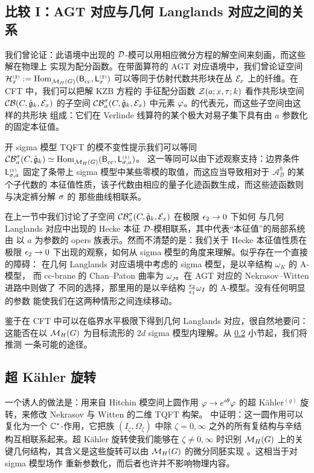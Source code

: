 \subsection{比较 I：AGT 对应与几何 Langlands 对应之间的关系}\label{comp-I}

我们曾论证：此语境中出现的 $\mathcal{D}$-模可以用相应微分方程的解空间来刻画，而这些解在物理上
实现为配分函数。在带面算符的 AGT 对应语境中，我们曾论证空间
$\mathcal{H}_{x}^{\scriptscriptstyle(2)}:=
{\rm Hom}_{\mathcal{M}_H(G)}^{}(\mathsf{B}_{\rm cc}^{},\mathsf{L}_{x}^{\scriptscriptstyle(2)})$
可以等同于仿射代数共形块在丛 $\mathcal{E}_x$ 上的纤维。在 CFT 中，我们可以把解 KZB 方程的
手征配分函数 $\mathcal{Z}(a;x,\tau;k)$ 看作共形块空间 $\mathcal{CB}(C,\hat{\mathfrak{g}}_k,\mathcal{E}_x)$ 的子空间
$\mathcal{CB}^\sigma_a(C,\hat{\mathfrak{g}}_k,\mathcal{E}_x)$ 中元素 $\varphi_a$ 的代表元，而这些子空间由这样的共形块
组成：它们在 Verlinde 线算符的某个极大对易子集下具有由 $a$ 参数化的固定本征值。

开 sigma 模型 TQFT 的模不变性提示我们可以等同
$\mathcal{CB}^\sigma_a(C,\hat{\mathfrak{g}}_k)\simeq 
{\rm Hom}_{\mathcal{M}_H(G)}^{}(\mathsf{B}_{\rm cc}^{},\mathsf{L}_{\sigma,a}^{\scriptscriptstyle(1)})$。
这一等同可以由下述观察支持：边界条件 $\mathsf{L}_{\sigma,a}^{\scriptscriptstyle(1)}$ 固定了条带上
sigma 模型中某些零模的取值，而这应当导致相对于 $\mathcal{A}_{B}^{\hbar}$ 的某个子代数的
本征值性质，该子代数由相应的量子化迹函数生成，而这些迹函数则与决定裤分解 $\sigma$ 的
那些曲线相联系。

在上一节中我们讨论了子空间 $\mathcal{CB}_a^\sigma(C,\hat{\mathfrak{g}}_k,\mathcal{E}_x)$ 在极限 $\epsilon_2\to 0$ 下如何
与几何 Langlands 对应中出现的 Hecke 本征 $\mathcal{D}$-模相联系，其中代表“本征值”的局部系统由
以 $a$ 为参数的 opers 族表示。然而不清楚的是：我们关于 Hecke 本征值性质在极限
$\epsilon_2\to 0$ 下出现的观察，如何从 sigma 模型的角度来理解。似乎存在一个直接的障碍：
\cite{KW} 在几何 Langlands 对应语境中考虑的 sigma 模型，是以辛结构 $\omega_K$ 的 A-模型，
而 cc-brane 的 Chan--Paton 曲率为 $\omega_J$。在 AGT 对应的 Nekrasov--Witten 进路中则做了
不同的选择，那里用的是以辛结构 $\frac{\epsilon_2}{\epsilon_1}\omega_I$ 的 A-模型。没有任何明显的参数
能使我们在这两种情形之间连续移动。

鉴于在 CFT 中可以在临界水平极限下得到几何 Langlands 对应，很自然地要问：这能否在以
$\mathcal{M}_H(G)$ 为目标流形的 $2d$ sigma 模型内理解。从 \ref{Cstaraction} 小节起，我们将推测
一条可能的途径。

\subsection{超 Kähler 旋转}\label{Cstaraction}

一个诱人的做法是：用来自 Hitchin 模空间上圆作用 $\varphi\to e^{i\theta}\varphi$ 的超
Kähler$^{(g)}$ 旋转，来修改 Nekrasov 与 Witten 的二维 TQFT 构架。\cite[Section 9]{Hi87}
中证明：这一圆作用可以复化为一个 $\mathbb{C}^*$-作用，它把族 $(I_\zeta,\Omega_\zeta)$ 中除
$\zeta=0,\infty$ 之外的所有复结构与辛结构互相联系起来。超 Kähler 旋转使我们能够在
$\zeta\neq 0,\infty$ 时识别 $\mathcal{M}_H(G)$ 上的关键几何结构，其含义是这些旋转可以由
$\mathcal{M}_H(G)$ 的微分同胚实现 \cite[Proposition (9.1)]{Hi87}。这相当于对 sigma 模型场作
重新参数化，而后者也许并不影响物理内容。


